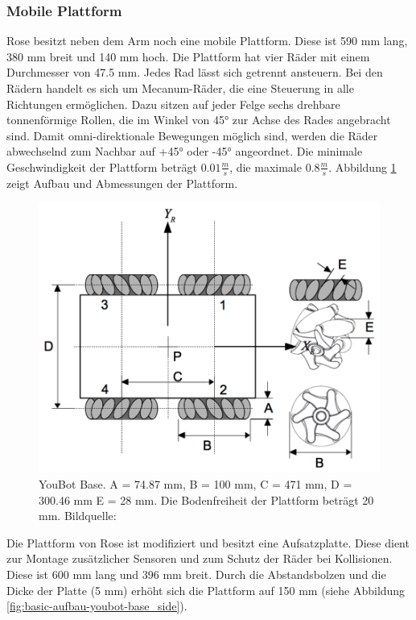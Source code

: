 \subsubsection{Mobile Plattform}
Rose besitzt neben dem Arm noch eine mobile Plattform. Diese ist 590 mm lang, 380 mm breit und 140 mm hoch. Die Plattform hat vier Räder mit einem Durchmesser von 47.5 mm. Jedes Rad lässt sich getrennt ansteuern. Bei den Rädern handelt es sich um Mecanum-Räder, die eine Steuerung in alle Richtungen ermöglichen. Dazu sitzen auf jeder Felge sechs drehbare tonnenförmige Rollen, die im Winkel von 45° zur Achse des Rades angebracht sind. Damit omni-direktionale Bewegungen möglich sind, werden die Räder abwechselnd zum Nachbar auf +45° oder -45° angeordnet. Die minimale Geschwindigkeit der Plattform beträgt $0.01\frac{m}{s}$, die maximale  $0.8\frac{m}{s}$. Abbildung \ref{fig:basic-aufbau-youbot-base} zeigt Aufbau und Abmessungen der Plattform. 

\begin{figure}[H]
	\centering
	\includegraphics[scale=0.5]{fig/kukabase}   
	\caption[YouBot Base]{YouBot Base. A = 74.87 mm, B = 100 mm, C = 471 mm, D = 300.46 mm E = 28 mm. Die Bodenfreiheit der Plattform beträgt 20 mm. Bildquelle: \cite{monikaflorekjasinska2015}}
	\label{fig:basic-aufbau-youbot-base}
\end{figure}

Die Plattform von Rose ist modifiziert und besitzt eine Aufsatzplatte. Diese dient zur Montage zusätzlicher Sensoren und zum Schutz der Räder bei Kollisionen. Diese ist 600 mm lang und 396 mm breit. Durch die Abstandsbolzen und die Dicke der Platte (5 mm) erhöht sich die Plattform auf 150 mm (siehe Abbildung \ref{fig:basic-aufbau-youbot-base_side}).  

